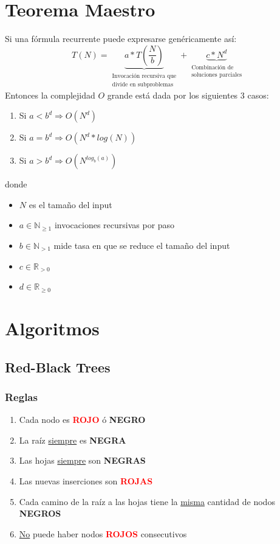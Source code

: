 \documentclass{article}
\begin{document}
\section{Teorema Maestro}
Si una fórmula recurrente puede expresarse genéricamente así:
\begin{equation*}
    T(N) = \underbrace{a*T(\frac{N}{b})}_{\substack{\text{Invocación recursiva que}\\ \text{divide en subproblemas}}} + \underbrace{c * N^d}_{\substack{\text{Combinación de}\\ \text{soluciones parciales}}}
\end{equation*}
Entonces la complejidad $O$ grande está dada por los siguientes 3 casos:
\begin{enumerate}
    \item Si $a < b^d \Rightarrow O(N^d)$
    \item Si $a = b^d \Rightarrow O(N^d * log(N))$
    \item Si $a > b^d \Rightarrow O(N^{log_b(a)})$
\end{enumerate}
donde 
\begin{itemize}
    \item $N$ es el tamaño del input
    \item $a \in \mathbb{N}_{\geq 1}$ invocaciones recursivas por paso
    \item $b \in \mathbb{N}_{> 1}$ mide tasa en que se reduce el tamaño del input
    \item $c \in \mathbb{R}_{>0}$
    \item $d \in \mathbb{R}_{\geq 0}$
\end{itemize}

\newpage
\section{Algoritmos}
\subsection{Red-Black Trees}
\subsubsection*{Reglas}
\begin{enumerate}
    \item Cada nodo es \textbf{\textcolor{red}{ROJO}} ó \textbf{NEGRO}
    \item La raíz \underline{siempre} es \textbf{NEGRA}
    \item Las hojas \underline{siempre} son \textbf{NEGRAS}
    \item Las nuevas inserciones son \textbf{\textcolor{red}{ROJAS}}
    \item Cada camino de la raíz a las hojas tiene la \underline{misma} cantidad de nodos \textbf{NEGROS}
    \item \underline{No} puede haber nodos \textbf{\textcolor{red}{ROJOS}} consecutivos
\end{enumerate}
\end{document}
